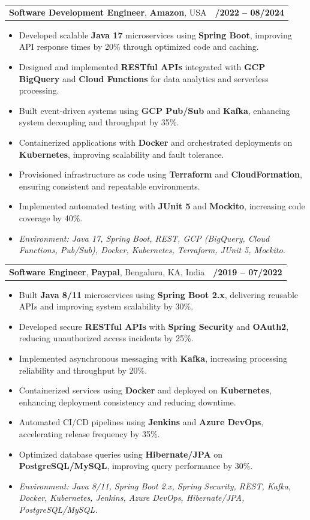 \documentclass[letterpaper,11pt]{article}
\makeatletter
\newcommand{\resumeItem}[1]{
  \item\footnotesize{
    {#1 \vspace{-2pt}}
  }
}
\newcommand{\resumeSubheading}[4]{
  \vspace{-2pt}\item
    \begin{tabular*}{1.0\textwidth}[t]{l@{\extracolsep{\fill}}r}
      \textbf{\fontsize{10pt}{14pt}\selectfont #3}, \textbf{\fontsize{10pt}{14pt}\selectfont #1}, \fontsize{10pt}{14pt}\selectfont #4 & \textbf{\fontsize{10pt}{14pt}\selectfont #2} \\
    \end{tabular*}\vspace{-7pt}
}
\newcommand{\resumeItemListStart}{\begin{itemize}[leftmargin=*]}
\newcommand{\resumeItemListEnd}{\end{itemize}\vspace{-5pt}}
\makeatother
\begin{document}
\resumeSubheading
{Amazon}{10/2022 -- 08/2024}
{Software Development Engineer}{USA}
\resumeItemListStart
  \resumeItem{Developed scalable \textbf{Java 17} microservices using \textbf{Spring Boot}, improving API response times by 20\% through optimized code and caching.}
  \resumeItem{Designed and implemented \textbf{RESTful APIs} integrated with \textbf{GCP BigQuery} and \textbf{Cloud Functions} for data analytics and serverless processing.}
  \resumeItem{Built event-driven systems using \textbf{GCP Pub/Sub} and \textbf{Kafka}, enhancing system decoupling and throughput by 35\%.}
  \resumeItem{Containerized applications with \textbf{Docker} and orchestrated deployments on \textbf{Kubernetes}, improving scalability and fault tolerance.}
  \resumeItem{Provisioned infrastructure as code using \textbf{Terraform} and \textbf{CloudFormation}, ensuring consistent and repeatable environments.}
  \resumeItem{Implemented automated testing with \textbf{JUnit 5} and \textbf{Mockito}, increasing code coverage by 40\%.}
  \resumeItem{\textit{Environment: Java 17, Spring Boot, REST, GCP (BigQuery, Cloud Functions, Pub/Sub), Docker, Kubernetes, Terraform, JUnit 5, Mockito.}}
\resumeItemListEnd

\resumeSubheading
{Paypal}{08/2019 -- 07/2022}
{Software Engineer}{Bengaluru, KA, India}
\resumeItemListStart
  \resumeItem{Built \textbf{Java 8/11} microservices using \textbf{Spring Boot 2.x}, delivering reusable APIs and improving system scalability by 30\%.}
  \resumeItem{Developed secure \textbf{RESTful APIs} with \textbf{Spring Security} and \textbf{OAuth2}, reducing unauthorized access incidents by 25\%.}
  \resumeItem{Implemented asynchronous messaging with \textbf{Kafka}, increasing processing reliability and throughput by 20\%.}
  \resumeItem{Containerized services using \textbf{Docker} and deployed on \textbf{Kubernetes}, enhancing deployment consistency and reducing downtime.}
  \resumeItem{Automated CI/CD pipelines using \textbf{Jenkins} and \textbf{Azure DevOps}, accelerating release frequency by 35\%.}
  \resumeItem{Optimized database queries using \textbf{Hibernate/JPA} on \textbf{PostgreSQL/MySQL}, improving query performance by 30\%.}
  \resumeItem{\textit{Environment: Java 8/11, Spring Boot 2.x, Spring Security, REST, Kafka, Docker, Kubernetes, Jenkins, Azure DevOps, Hibernate/JPA, PostgreSQL/MySQL.}}
\resumeItemListEnd
\end{document}
